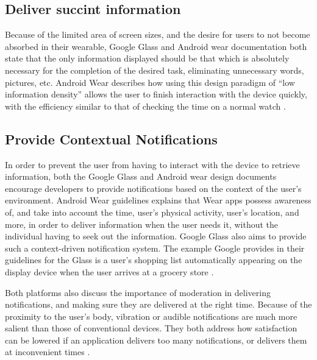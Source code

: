 \documentclass[12pt]{article}
\begin{document}
\subsection{Deliver succint information}
Because of the limited area of screen sizes, and the desire for users to not become absorbed in their wearable, Google Glass and Android wear documentation both state that the only information displayed should be that which is absolutely necessary for the completion of the desired task, eliminating unnecessary words, pictures, etc. Android Wear describes how using this design paradigm of ``low information density'' allows the user to finish interaction with the device quickly, with the efficiency similar to that of checking the time on a normal watch \cite{andr3}. 

\subsection{Provide Contextual Notifications}
In order to prevent the user from having to interact with the device to retrieve information, both the Google Glass and Android wear design documents encourage developers to provide notifications based on the context of the user's environment. Android Wear guidelines explains that Wear apps possess awareness of, and take into account the time, user's physical activity, user's location, and more, in order to deliver information when the user needs it, without the individual having to seek out the information\cite{andr2}. Google Glass also aims to provide such a context-driven notification system. The example Google provides in their guidelines for the Glass is a user's shopping list automatically appearing on the display device when the user arrives at a grocery store \cite{goog}.

Both platforms also discuss the importance of moderation in delivering notifications, and making sure they are delivered at the right time. Because of the proximity to the user's body, vibration or audible notifications are much more salient than those of conventional devices. They both address how satisfaction can be lowered if an application delivers too many notifications, or delivers them at inconvenient times \cite{goog} \cite{andr}.
\end{document}
